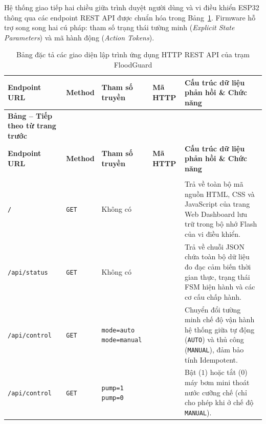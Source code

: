 Hệ thống giao tiếp hai chiều giữa trình duyệt người dùng và vi điều khiển ESP32 thông qua các endpoint REST API được chuẩn hóa trong Bảng~\ref{tab:api_specifications}. Firmware hỗ trợ song song hai cú pháp: tham số trạng thái tường minh (\textit{Explicit State Parameters}) và mã hành động (\textit{Action Tokens}).

\begingroup
\setlength{\tabcolsep}{4pt}
\small
\renewcommand{\arraystretch}{1.25}
\begin{longtable}{|>{\raggedright\arraybackslash}p{2.5cm}|>{\centering\arraybackslash}p{1.6cm}|>{\raggedright\arraybackslash}p{3.8cm}|>{\centering\arraybackslash}p{1.7cm}|>{\raggedright\arraybackslash}p{4.9cm}|}
\caption{Bảng đặc tả các giao diện lập trình ứng dụng HTTP REST API của trạm FloodGuard} \label{tab:api_specifications} \\
\hline
\textbf{Endpoint URL} & \textbf{Method} & \textbf{Tham số truyền} & \textbf{Mã HTTP} & \textbf{Cấu trúc dữ liệu phản hồi \& Chức năng} \\ \hline
\endfirsthead

\multicolumn{5}{c}%
{{\bfseries Bảng \thetable{} -- Tiếp theo từ trang trước}} \\
\hline
\textbf{Endpoint URL} & \textbf{Method} & \textbf{Tham số truyền} & \textbf{Mã HTTP} & \textbf{Cấu trúc dữ liệu phản hồi \& Chức năng} \\ \hline
\endhead

\hline \multicolumn{5}{|r|}{{\footnotesize\textit{(Còn tiếp ở trang sau)}}} \\ \hline
\endfoot

\hline
\endlastfoot

\texttt{/} & \texttt{GET} & Không có & 200 & Trả về toàn bộ mã nguồn HTML, CSS và JavaScript của trang Web Dashboard lưu trữ trong bộ nhớ Flash của vi điều khiển. \\ \hline

\texttt{/api/status} & \texttt{GET} & Không có & 200 & Trả về chuỗi JSON chứa toàn bộ dữ liệu đo đạc cảm biến thời gian thực, trạng thái FSM hiện hành và các cơ cấu chấp hành. \\ \hline

\texttt{/api/control} & \texttt{GET} & \texttt{mode=auto} \newline \texttt{mode=manual} & 200 & Chuyển đổi tường minh chế độ vận hành hệ thống giữa tự động (\texttt{AUTO}) và thủ công (\texttt{MANUAL}), đảm bảo tính Idempotent. \\ \hline

\texttt{/api/control} & \texttt{GET} & \texttt{pump=1} \newline \texttt{pump=0} & 200 & Bật ($1$) hoặc tắt ($0$) máy bơm mini thoát nước cưỡng chế (chỉ cho phép khi ở chế độ \texttt{MANUAL}). \\ \hline


\end{longtable}
